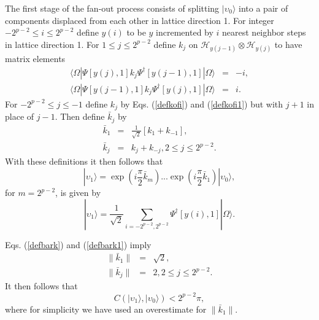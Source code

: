 \documentclass[12pt,amsmath,amssymb,onecolumn]{revtex4-2}
\begin{document}
The first stage of the fan-out process consists of
splitting $|\upsilon_0 \rangle $ into a pair of components displaced from
each other in lattice direction 1.
For integer $-2^{p-2} \le i \le 2^{p-2}$ define $y( i)$ to be
$y$ incremented by $i$ nearest neighbor steps
in lattice direction 1. For $1 \le j \le 2^{p-2}$ define
$k_j$ on $\mathcal{H}_{y( j -1)} \otimes \mathcal{H}_{y(j)}$ to have
matrix elements
\begin{subequations}
\begin{eqnarray}
\label{defkofi}
 \langle  \Omega| \Psi[y(j),1] k_j  \Psi^{\dagger}[y(j-1),1]|\Omega \rangle  &=& -i, \\
\label{defkofi1}
 \langle  \Omega| \Psi[y(j-1), 1]  k_j \Psi^{\dagger}[ y(j),1]|\Omega \rangle  &=& i.
\end{eqnarray}
\end{subequations}
For $-2^{p-2} \le j \le -1$ define
$k_j$ by Eqs. (\ref{defkofi}) and (\ref{defkofi1}) but with $j+1$
in place of $j-1$.
Then define $\bar{k}_j$ by
\begin{subequations}
  \begin{eqnarray}
    \label{defbark}
    \bar{k}_1 & = & \frac{1}{\sqrt{2}}[ k_1 + k_{-1}], \\
   \label{defbark1}
   \bar{k}_j & = &  k_j + k_{-j}, 2 \le j \le 2^{p-2}.
  \end{eqnarray}
\end{subequations}
With these definitions it then follows that
\begin{equation}
\label{defupsilon1}
|\upsilon_1 \rangle  = 
\exp(i \frac{\pi}{2}\bar{ k}_m) ... \exp(i \frac{\pi}{2} \bar{ k}_1) |\upsilon_0 \rangle ,
\end{equation}
for $m = 2^{p-2}$,
is given by
\begin{equation}
\label{defupsilon11}
|\upsilon_1 \rangle  = \frac{1}{\sqrt{2}}\sum_{i = -2^{p-2},2^{p-2}}  \Psi^{\dagger}[ y(i), 1] |\Omega \rangle .
\end{equation}

Eqs. (\ref{defbark}) and (\ref{defbark1}) imply
\begin{subequations}
  \begin{eqnarray}
       \label{defbarkn}
   \parallel \bar{k}_1 \parallel & = & \sqrt{2}, \\
   \label{defbark1n}
  \parallel \bar{k}_j\parallel & = &  2, 2 \le j \le 2^{p-2}.
  \end{eqnarray}
\end{subequations}
It then follows that
\begin{equation}
  \label{stageoneb}
  C( |\upsilon_1 \rangle , |\upsilon_0 \rangle ) < 2^{p-2} \pi,
\end{equation}
where for simplicity we have used an overestimate for $\parallel \bar{k}_1 \parallel$.
\end{document}
